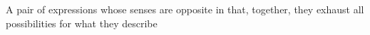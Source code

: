 A pair of expressions whose senses are opposite in that, together, they exhaust all possibilities for what they describe
